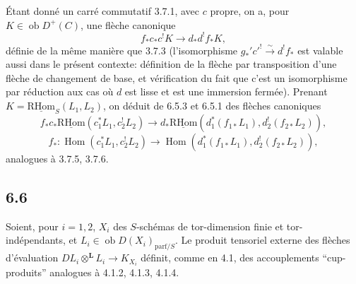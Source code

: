 \documentclass[11pt]{article}
\DeclareMathOperator{\Hom}{Hom}
\newcommand{\R}{\mathrm{R}}\newcommand{\RHomCore}{\mathrm{RHom}}
\providecommand{\RHom}{\RHomCore}
\providecommand{\uRHom}{\underline{\RHom}}
\providecommand{\RHom}{\RHomCore}
\providecommand{\Hom}{\operatorname{Hom}}
\providecommand{\RHom}{\R\mathcal{H}om}
\providecommand{\R}{\mathrm R}
\providecommand{\RHom}{\RHomCore}
\providecommand{\Hom}{\operatorname{Hom}}
\begin{document}
Étant donné un carré commutatif 3.7.1, avec $c$ propre, on a, pour $K\in\operatorname{ob}D^+(C)$, une flèche canonique
\begin{equation}
\tag{6.5.3}
f_*c_*c^!K\longrightarrow d_*d^!f_*K,
\end{equation}
définie de la même manière que 3.7.3 (l'isomorphisme $g_*'c'^!\xrightarrow{\sim}d^!f_*$ est valable aussi dans le présent contexte: définition de la flèche par transposition d'une flèche de changement de base, et vérification du fait que c'est un isomorphisme par réduction aux cas où $d$ est lisse et est une immersion fermée). Prenant $K=\uRHom_S(L_1,L_2)$, on déduit de 6.5.3 et 6.5.1 des flèches canoniques
\begin{equation}
\tag{6.5.4}
f_*c_*\uRHom(c_1^*L_1,c_2^!L_2)\longrightarrow d_*\uRHom(d_1^*(f_{1*}L_1),d_2^!(f_{2*}L_2)),
\end{equation}
\begin{equation}
\tag{6.5.5}
f_*:\Hom(c_1^*L_1,c_2^!L_2)\longrightarrow\Hom(d_1^*(f_{1*}L_1),d_2^!(f_{2*}L_2)),
\end{equation}
analogues à 3.7.5, 3.7.6.

\subsection*{6.6}
Soient, pour $i=1,2$, $X_i$ des $S$-schémas de tor-dimension finie et tor-indépendants, et $L_i\in\operatorname{ob}D(X_i)_{\mathrm{parf}/S}$. Le produit tensoriel externe des flèches d'évaluation $DL_i\otimes^{\mathbf L}L_i\to K_{X_i}$ définit, comme en 4.1, des accouplements ``cup-produits'' analogues à 4.1.2, 4.1.3, 4.1.4.
\end{document}
